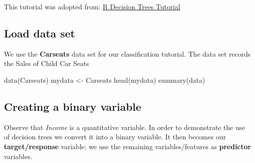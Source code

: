 \documentclass[
]{article}
\newenvironment{Shaded}{\begin{snugshade}}{\end{snugshade}}
\newcommand{\CommentTok}[1]{\textcolor[rgb]{0.56,0.35,0.01}{\textit{#1}}}
\newcommand{\DecValTok}[1]{\textcolor[rgb]{0.00,0.00,0.81}{#1}}
\newcommand{\FunctionTok}[1]{\textcolor[rgb]{0.00,0.00,0.00}{#1}}
\newcommand{\NormalTok}[1]{#1}
\newcommand{\OtherTok}[1]{\textcolor[rgb]{0.56,0.35,0.01}{#1}}
\newcommand{\SpecialCharTok}[1]{\textcolor[rgb]{0.00,0.00,0.00}{#1}}
\newcommand{\StringTok}[1]{\textcolor[rgb]{0.31,0.60,0.02}{#1}}
\begin{document}
This tutorial was adopted from:
\href{https://www.datacamp.com/tutorial/decision-trees-R}{R Decision
Trees Tutorial}

\hypertarget{load-data-set-1}{%
\subsection{Load data set}\label{load-data-set-1}}

We use the \textbf{Carseats} data set for our classification tutorial.
The data set records the Sales of Child Car Seats

\begin{Shaded}
\begin{Highlighting}[]
\FunctionTok{data}\NormalTok{(Carseats)}
\NormalTok{mydata }\OtherTok{\textless{}{-}}\NormalTok{ Carseats}
\FunctionTok{head}\NormalTok{(mydata)}
\FunctionTok{summary}\NormalTok{(data)}
\end{Highlighting}
\end{Shaded}

\hypertarget{creating-a-binary-variable}{%
\subsection{Creating a binary
variable}\label{creating-a-binary-variable}}

Observe that \emph{Income} is a quantitative variable. In order to
demonstrate the use of decision trees we convert it into a binary
variable. It then becomes our \textbf{target/response} variable; we use
the remaining variables/features as \textbf{predictor} variables.

\begin{Shaded}
\end{Shaded}
\end{document}
